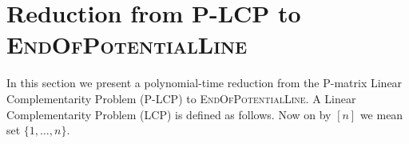 \documentclass[a4paper,UKenglish]{lipics2}
\theoremstyle{definition}
\def\problem#1{\textsc{#1}}
\def\EOPL{\problem{EndOfPotentialLine}\xspace}
\def\EOML{\problem{EndOfMeteredLine}\xspace}
\def\PLCP{\problem{P-LCP}\xspace}
\begin{document}

\section{Reduction from \PLCP to \EOPL}
\label{sec:PLCPtoEOPL}

In this section we present a polynomial-time reduction from the P-matrix Linear
Complementarity Problem (\PLCP) to \EOPL.
A Linear Complementarity Problem (LCP) is defined as follows. Now on by $[n]$ we mean set $\{1,\dots,n\}$.
\end{document}
